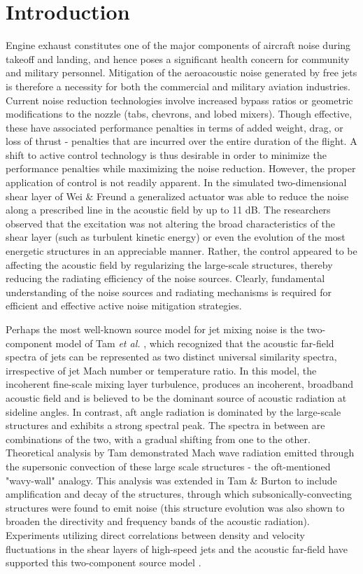 \documentclass[english]{aiaa-tc}
\begin{document}
\section{Introduction}
Engine exhaust constitutes one of the major components of aircraft noise during takeoff and landing, and hence poses a significant health concern for community and military personnel. Mitigation of the aeroacoustic noise generated by free jets is therefore a necessity for both the commercial and military aviation industries. Current noise reduction technologies involve increased bypass ratios or geometric modifications to the nozzle (tabs, chevrons, and lobed mixers). Though effective, these have associated performance penalties in terms of added weight, drag, or loss of thrust - penalties that are incurred over the entire duration of the flight. A shift to active control technology is thus desirable in order to minimize the performance penalties while maximizing the noise reduction. However, the proper application of control is not readily apparent. In the simulated two-dimensional shear layer of Wei \& Freund \cite{Wei2006} a generalized actuator was able to reduce the noise along a prescribed line in the acoustic field by up to 11 dB. The researchers observed that the excitation was not altering the broad characteristics of the shear layer (such as turbulent kinetic energy) or even the evolution of the most energetic structures in an appreciable manner. Rather, the control appeared to be affecting the acoustic field by regularizing the large-scale structures, thereby reducing the radiating efficiency of the noise sources. Clearly, fundamental understanding of the noise sources and radiating mechanisms is required for efficient and effective active noise mitigation strategies.

Perhaps the most well-known source model for jet mixing noise is the two-component model of Tam \textit{et al.} \cite{Tam1996}, which recognized that the acoustic far-field spectra of jets can be represented as two distinct universal similarity spectra, irrespective of jet Mach number or temperature ratio. In this model, the incoherent fine-scale mixing layer turbulence, produces an incoherent, broadband acoustic field and is believed to be the dominant source of acoustic radiation at sideline angles. In contrast, aft angle radiation is dominated by the large-scale structures and exhibits a strong spectral peak. The spectra in between are combinations of the two, with a gradual shifting from one to the other. Theoretical analysis by Tam \cite{Tam1971} demonstrated Mach wave radiation emitted through the supersonic convection of these large scale structures - the oft-mentioned "wavy-wall" analogy. This analysis was extended in Tam \& Burton \cite{Tam1984} to include amplification and decay of the structures, through which subsonically-convecting structures were found to emit noise (this structure evolution was also shown to broaden the directivity and frequency bands of the acoustic radiation). Experiments utilizing direct correlations between density and velocity fluctuations in the shear layers of high-speed jets and the
acoustic far-field have supported this two-component source model \cite{Panda2002,Panda2005b}.
\end{document}
